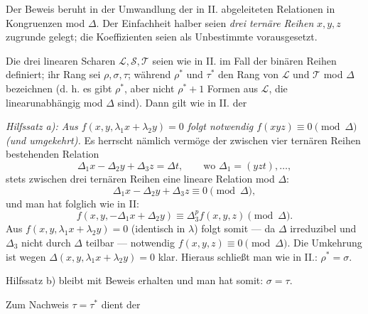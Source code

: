 Der Beweis beruht in der Umwandlung der in II. abgeleiteten Relationen in Kongruenzen mod $\Delta$. Der Einfachheit halber seien \emph{drei ternäre Reihen} $x,y,z$ zugrunde gelegt; die Koeffizienten seien als Unbestimmte vorausgesetzt.

Die drei linearen Scharen $\mathcal L,\mathcal S,\mathcal T$ seien wie in II. im Fall der binären Reihen definiert; ihr Rang sei $\rho,\sigma,\tau$; während $\rho^*$ und $\tau^*$ den Rang von $\mathcal L$ und $\mathcal T$ mod $\Delta$ bezeichnen (d. h. es gibt $\rho^*$, aber nicht $\rho^*+1$ Formen aus $\mathcal L$, die linearunabhängig mod $\Delta$ sind). Dann gilt wie in II. der

\emph{Hilfssatz a): Aus $f(x,y,\lambda_1x+\lambda_2y)=0$ folgt notwendig $f(xyz)\equiv0\pmod{\Delta}$ (und umgekehrt).} Es herrscht nämlich vermöge der zwischen vier ternären Reihen bestehenden Relation
\[
  \Delta_1x-\Delta_2y+\Delta_3z=\Delta t,
  \qquad \text{wo }\Delta_1=(yzt),\ldots,
\]
stets zwischen drei ternären Reihen eine lineare Relation mod $\Delta$:
\[
  \Delta_1x-\Delta_2y+\Delta_3z\equiv0\pmod{\Delta},
\]
und man hat folglich wie in II:
\[
  f(x,y,-\Delta_1x+\Delta_2y)\equiv\Delta_3^p f(x,y,z)\pmod{\Delta}.
\]
Aus $f(x,y,\lambda_1x+\lambda_2y)=0$ (identisch in $\lambda$) folgt somit --- da $\Delta$ irreduzibel und $\Delta_3$ nicht durch $\Delta$ teilbar --- notwendig $f(x,y,z)\equiv0\pmod{\Delta}$. Die Umkehrung ist wegen $\Delta(x,y,\lambda_1x+\lambda_2y)=0$ klar. Hieraus schließt man wie in II.: $\rho^*=\sigma$.

Hilfssatz b) bleibt mit Beweis erhalten und man hat somit: $\sigma=\tau$.

Zum Nachweis $\tau=\tau^*$ dient der

